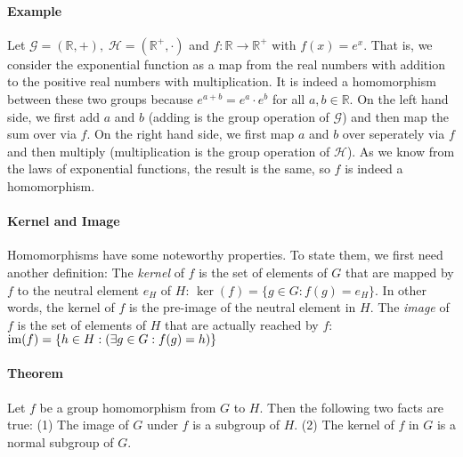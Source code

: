 \paragraph{Example}
Let  $\mathcal{G} = (\mathbb{R}, +), \; \mathcal{H} = (\mathbb{R}^+, \cdot)$ and $f: \mathbb{R} \rightarrow \mathbb{R}^+$ with $f(x) = e^x$. That is, we consider the exponential function as a map from the real numbers with addition to the positive real numbers with multiplication. It is indeed a homomorphism between these two groups because $e^{a+b} = e^a \cdot e^b$ for all $a,b \in \mathbb{R}$. On the left hand side, we first add $a$ and $b$ (adding is the group operation of $\mathcal{G}$) and then map the sum over via $f$. On the right hand side, we first map $a$ and $b$ over seperately via $f$ and then multiply (multiplication is the group operation of $\mathcal{H}$). As we know from the laws of exponential functions, the result is the same, so $f$ is indeed a homomorphism.




\paragraph{Kernel and Image} Homomorphisms have some noteworthy properties. To state them, we first need another definition: The \emph{kernel} of $f$ is the set of elements of $G$ that are mapped by $f$ to the neutral element $e_H$ of $H$: $\ker(f) = \{ g \in G: f(g) = e_H \}$. In other words, the kernel of $f$ is the pre-image of the neutral element in $H$. The \emph{image} of $f$ is the set of elements of $H$ that are actually reached by $f$: $\operatorname{im}(f) = \{ h \in H: (\exists g \in G: f(g) = h )\}$

\paragraph{Theorem} Let $f$ be a group homomorphism from $G$ to $H$. Then the following two facts are true: (1) The image of $G$ under $f$ is a subgroup of $H$. (2) The kernel of $f$ in $G$ is a normal subgroup of $G$.

